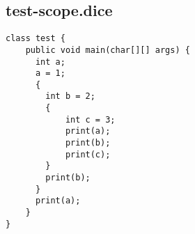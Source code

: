 \subsection{test-scope.dice}
\begin{verbatim}
class test {
	public void main(char[][] args) {
	  int a;
	  a = 1;
	  {
	  	int b = 2;
	  	{
	  		int c = 3;
	  		print(a);
	  		print(b);
	  		print(c);
	  	}
	  	print(b);
	  }
	  print(a);
	}
}

\end{verbatim}